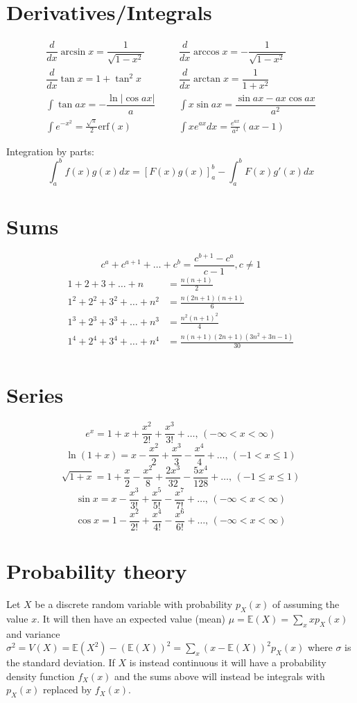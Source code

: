 \section{Derivatives/Integrals}
\begin{align*}
	\dfrac{d}{dx}\arcsin x = \dfrac{1}{\sqrt{1-x^2}} &&& \dfrac{d}{dx}\arccos x = -\dfrac{1}{\sqrt{1-x^2}} \\
	\dfrac{d}{dx}\tan x = 1+\tan^2 x &&& \dfrac{d}{dx}\arctan x = \dfrac{1}{1+x^2} \\
	\int\tan ax = -\dfrac{\ln|\cos ax|}{a} &&& \int x\sin ax = \dfrac{\sin ax-ax \cos ax}{a^2} \\
	\int e^{-x^2} = \frac{\sqrt \pi}{2} \text{erf}(x) &&& \int xe^{ax}dx = \frac{e^{ax}}{a^2}(ax-1)
\end{align*}

Integration by parts:
\[\int_a^bf(x)g(x)dx = [F(x)g(x)]_a^b-\int_a^bF(x)g'(x)dx\]

\section{Sums}
\[ c^a + c^{a+1} + \dots + c^{b} = \frac{c^{b+1} - c^a}{c-1}, c \neq 1 \]
\begin{align*}
	1 + 2 + 3 + \dots + n &= \frac{n(n+1)}{2} \\
	1^2 + 2^2 + 3^2 + \dots + n^2 &= \frac{n(2n+1)(n+1)}{6} \\
	1^3 + 2^3 + 3^3 + \dots + n^3 &= \frac{n^2(n+1)^2}{4} \\
	1^4 + 2^4 + 3^4 + \dots + n^4 &= \frac{n(n+1)(2n+1)(3n^2 + 3n - 1)}{30} \\
\end{align*}

\section{Series} 
$$e^x = 1+x+\frac{x^2}{2!}+\frac{x^3}{3!}+\dots,\,(-\infty<x<\infty)$$
$$\ln(1+x) = x-\frac{x^2}{2}+\frac{x^3}{3}-\frac{x^4}{4}+\dots,\,(-1<x\leq1)$$
$$\sqrt{1+x} = 1+\frac{x}{2}-\frac{x^2}{8}+\frac{2x^3}{32}-\frac{5x^4}{128}+\dots,\,(-1\leq x\leq1)$$
$$\sin x = x-\frac{x^3}{3!}+\frac{x^5}{5!}-\frac{x^7}{7!}+\dots,\,(-\infty<x<\infty)$$
$$\cos x = 1-\frac{x^2}{2!}+\frac{x^4}{4!}-\frac{x^6}{6!}+\dots,\,(-\infty<x<\infty)$$

\section{Probability theory}
Let $X$ be a discrete random variable with probability $p_X(x)$ of assuming the value $x$. It will then have an expected value (mean) $\mu=\mathbb{E}(X)=\sum_xxp_X(x)$ and variance $\sigma^2=V(X)=\mathbb{E}(X^2)-(\mathbb{E}(X))^2=\sum_x(x-\mathbb{E}(X))^2p_X(x)$ where $\sigma$ is the standard deviation. If $X$ is instead continuous it will have a probability density function $f_X(x)$ and the sums above will instead be integrals with $p_X(x)$ replaced by $f_X(x)$.

